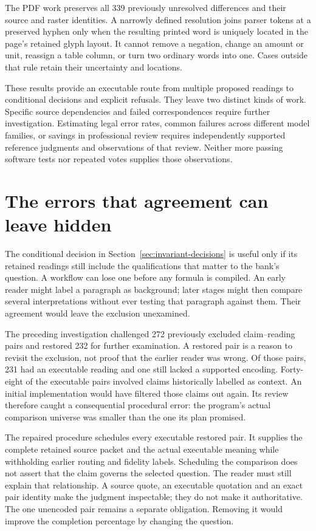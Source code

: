 \documentclass[12pt,a4paper,oneside,openany]{book}
\begin{document}
The PDF work preserves all 339 previously unresolved differences and their
source and raster identities. A narrowly defined resolution joins parser
tokens at a preserved hyphen only when the resulting printed word is uniquely
located in the page's retained glyph layout. It cannot remove a negation,
change an amount or unit, reassign a table column, or turn two ordinary words
into one. Cases outside that rule retain their uncertainty and locations.

These results provide an executable route from multiple proposed readings to
conditional decisions and explicit refusals. They leave two distinct kinds of
work. Specific source dependencies and failed correspondences require further
investigation. Estimating legal error rates, common failures across different
model families, or savings in professional review requires independently
supported reference judgments and observations of that review. Neither more
passing software tests nor repeated votes supplies those observations.



\section{The errors that agreement can leave hidden}
\label{sec:executed-assurance}

The conditional decision in Section~\ref{sec:invariant-decisions} is useful only
if its retained readings still include the qualifications that matter to the
bank's question. A workflow can lose one before any formula is compiled. An
early reader might label a paragraph as background; later stages might then
compare several interpretations without ever testing that paragraph against
them. Their agreement would leave the exclusion unexamined.

The preceding investigation challenged 272 previously excluded claim--reading
pairs and restored 232 for further examination. A restored pair is a reason to
revisit the exclusion, not proof that the earlier reader was wrong. Of those
pairs, 231 had an executable reading and one still lacked a supported encoding.
Forty-eight of the executable pairs involved claims historically labelled as
context. An initial implementation would have filtered those claims out again.
Its review therefore caught a consequential procedural error: the program's
actual comparison universe was smaller than the one its plan promised.

The repaired procedure schedules every executable restored pair. It supplies
the complete retained source packet and the actual executable meaning while
withholding earlier routing and fidelity labels. Scheduling the comparison does
not assert that the claim governs the selected question. The reader must still
explain that relationship. A source quote, an executable quotation and an exact
pair identity make the judgment inspectable; they do not make it authoritative.
The one unencoded pair remains a separate obligation. Removing it would improve
the completion percentage by changing the question.
\end{document}
